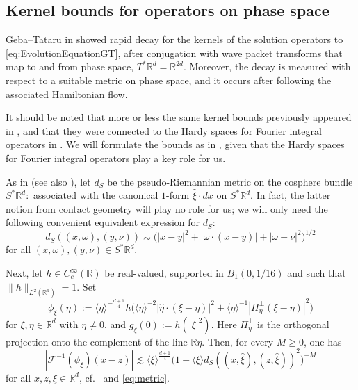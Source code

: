 \documentclass{amsart}
\numberwithin{equation}{section}
\theoremstyle{definition}
\newcommand{\R}{\mathbb{R}}
\newcommand{\Rd}{\mathbb{R}^{d}}
\newcommand{\F}{\mathcal{F}}
\newcommand {\Sp}{S^{*}\Rd}
\newcommand {\w}{\omega}
\newcommand {\rb}{\rangle}
\newcommand {\lb}{\langle}
\begin{document}
\subsection{Kernel bounds for operators on phase space}

Geba--Tataru in \cite{GebaTataru2007} showed rapid decay for the kernels of the solution operators to \eqref{eq:EvolutionEquationGT}, after conjugation with wave packet transforms that map to and from phase space, $T^{*}\Rd=\R^{2d}$. Moreover, the decay is measured with respect to a suitable metric on phase space, and it occurs after following the associated Hamiltonian flow. 

It should be noted that more or less the same kernel bounds previously appeared in \cite{Smith98a,Smith1998}, and that they were connected to the Hardy spaces for Fourier integral operators in \cite{Smith98a,HassellPortalRozendaal2020}. We will formulate the bounds as in \cite{HassellPortalRozendaal2020}, given that the Hardy spaces for Fourier integral operators play a key role for us.

As in \cite[Section 2.1]{HassellPortalRozendaal2020} (see also \cite[Section 7]{GebaTataru2007}), let $d_{S}$ be the pseudo-Riemannian metric on the cosphere bundle $\Sp:$ associated with the canonical $1$-form $\hat{\xi}\cdot dx$ on $\Sp$. In fact, the latter notion from contact geometry will play no role for us; 
we will only need the 
following convenient equivalent expression for $d_{S}$:
\begin{equation}\label{eq:metric}
d_{S}((x,\w),(y,\nu))\eqsim \big(|x-y|^{2}+|\w\cdot(x-y)|+|\w-\nu|^{2}\big)^{1/2}
\end{equation}
for all $(x,\w),(y,\nu)\in\Sp$. 

Next, let $h\in C^{\infty}_{c}(\R)$ be real-valued, supported in $B_{1}(0,1/16)$ and such that $\|h\|_{L^{2}(\Rd)}=1$. Set
\[
\phi_{\xi}(\eta) := \langle \eta \rangle^{-\frac{d+1}{4}} h\big(\lb\eta\rb^{-2}|\hat{\eta} \cdot (\xi-\eta)|^2+\lb\eta\rb^{-1}|\Pi_{\eta}^{\perp}(\xi-\eta)|^{2}\big)
\]
for $\xi,\eta\in\Rd$ with $\eta\neq 0$, and $g_{\xi}(0):=h(|\xi|^{2})$. Here $\Pi_{\eta}^{\perp}$ is the orthogonal projection onto the complement of the line $\R\eta$. Then, for every $M\geq0$, one has 
\begin{equation}\label{eq:kernelboundspacket}
|\F^{-1}(\phi_{\xi})(x-z)|\lesssim \lb \xi\rb^{\frac{d+1}{4}}\big(1+\lb\xi\rb d_{S}((x,\hat{\xi}),(z,\hat{\xi}))^{2}\big)^{-M}
\end{equation}
for all $x,z,\xi\in\Rd$, cf.~\cite[p.~ 1074]{GebaTataru2007} and \eqref{eq:metric}. 
\end{document}

